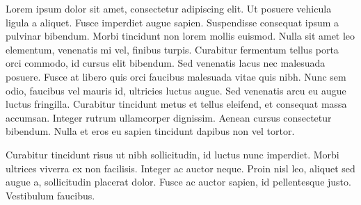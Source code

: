 \begin{acknowledgements}

  Lorem ipsum dolor sit amet, consectetur adipiscing elit. Ut posuere vehicula ligula a aliquet. Fusce imperdiet augue sapien. Suspendisse consequat ipsum a pulvinar bibendum. Morbi tincidunt non lorem mollis euismod. Nulla sit amet leo elementum, venenatis mi vel, finibus turpis. Curabitur fermentum tellus porta orci commodo, id cursus elit bibendum. Sed venenatis lacus nec malesuada posuere. Fusce at libero quis orci faucibus malesuada vitae quis nibh. Nunc sem odio, faucibus vel mauris id, ultricies luctus augue. Sed venenatis arcu eu augue luctus fringilla. Curabitur tincidunt metus et tellus eleifend, et consequat massa accumsan. Integer rutrum ullamcorper dignissim. Aenean cursus consectetur bibendum. Nulla et eros eu sapien tincidunt dapibus non vel tortor.

  Curabitur tincidunt risus ut nibh sollicitudin, id luctus nunc imperdiet. Morbi ultrices viverra ex non facilisis. Integer ac auctor neque. Proin nisl leo, aliquet sed augue a, sollicitudin placerat dolor. Fusce ac auctor sapien, id pellentesque justo. Vestibulum faucibus.


\end{acknowledgements}





